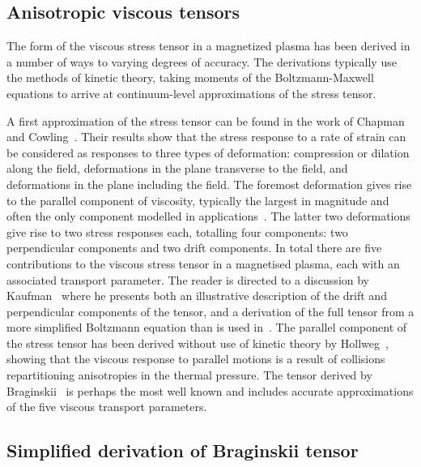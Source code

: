 \subsection{Anisotropic viscous tensors}

The form of the viscous stress tensor in a magnetized plasma has been derived in a number of ways to varying degrees of accuracy. The derivations typically use the methods of kinetic theory, taking moments of the Boltzmann-Maxwell equations to arrive at continuum-level approximations of the stress tensor.

A first approximation of the stress tensor can be found in the work of Chapman and Cowling~\cite{chapmanMathematicalTheoryNonuniform1970}. Their results show that the stress response to a rate of strain can be considered as responses to three types of deformation: compression or dilation along the field, deformations in the plane transverse to the field, and deformations in the plane including the field. The foremost deformation gives rise to the parallel component of viscosity, typically the largest in magnitude and often the only component modelled in applications~\cite{parrishEffectsAnisotropicViscosity2012a}. The latter two deformations give rise to two stress responses each, totalling four components: two perpendicular components and two drift components. In total there are five contributions to the viscous stress tensor in a magnetised plasma, each with an associated transport parameter. The reader is directed to a discussion by Kaufman~\cite{kaufmanPlasmaViscosityMagnetic1960} where he presents both an illustrative description of the drift and perpendicular components of the tensor, and a derivation of the full tensor from a more simplified Boltzmann equation than is used in~\cite{chapmanMathematicalTheoryNonuniform1970}. The parallel component of the stress tensor has been derived without use of kinetic theory by Hollweg~\cite{hollwegViscosityMagnetizedPlasma1985}, showing that the viscous response to parallel motions is a result of collisions repartitioning anisotropies in the thermal pressure. The tensor derived by Braginskii~\cite{braginskiiTransportProcessesPlasma1965} is perhaps the most well known and includes accurate approximations of the five viscous transport parameters.

\subsection{Simplified derivation of Braginskii tensor}

